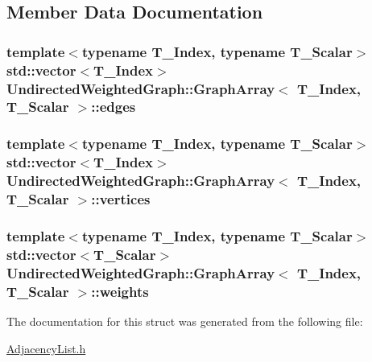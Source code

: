 \subsection{Member Data Documentation}
\hypertarget{struct_undirected_weighted_graph_1_1_graph_array_ae11fa2a6dad43302b76d8c0c3cd43b8e}{
\subsubsection[{edges}]{\setlength{\rightskip}{0pt plus 5cm}template$<$typename T\+\_\+\+Index, typename T\+\_\+\+Scalar$>$ std\+::vector$<$T\+\_\+\+Index$>$ {\bf Undirected\+Weighted\+Graph\+::\+Graph\+Array}$<$ T\+\_\+\+Index, T\+\_\+\+Scalar $>$\+::edges}}\label{struct_undirected_weighted_graph_1_1_graph_array_ae11fa2a6dad43302b76d8c0c3cd43b8e}
\hypertarget{struct_undirected_weighted_graph_1_1_graph_array_a81fa36cd9facc14c41f4fcccde694f15}{
\subsubsection[{vertices}]{\setlength{\rightskip}{0pt plus 5cm}template$<$typename T\+\_\+\+Index, typename T\+\_\+\+Scalar$>$ std\+::vector$<$T\+\_\+\+Index$>$ {\bf Undirected\+Weighted\+Graph\+::\+Graph\+Array}$<$ T\+\_\+\+Index, T\+\_\+\+Scalar $>$\+::vertices}}\label{struct_undirected_weighted_graph_1_1_graph_array_a81fa36cd9facc14c41f4fcccde694f15}
\hypertarget{struct_undirected_weighted_graph_1_1_graph_array_a56c78312ffe5c1948aeaf930cbb61fb3}{
\subsubsection[{weights}]{\setlength{\rightskip}{0pt plus 5cm}template$<$typename T\+\_\+\+Index, typename T\+\_\+\+Scalar$>$ std\+::vector$<$T\+\_\+\+Scalar$>$ {\bf Undirected\+Weighted\+Graph\+::\+Graph\+Array}$<$ T\+\_\+\+Index, T\+\_\+\+Scalar $>$\+::weights}}\label{struct_undirected_weighted_graph_1_1_graph_array_a56c78312ffe5c1948aeaf930cbb61fb3}


The documentation for this struct was generated from the following file\+:\begin{DoxyCompactItemize}
\item 
\hyperlink{_adjacency_list_8h}{Adjacency\+List.\+h}\end{DoxyCompactItemize}

